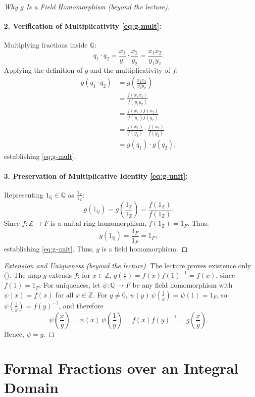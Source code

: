 \begin{content}
\begin{proof}[Why $g$ Is a Field Homomorphism (beyond the lecture)]
\paragraph{2. Verification of Multiplicativity \eqref{eq:g-mult}:}
Multiplying fractions inside $\mathbb{Q}$:
\[
q_1 \cdot q_2 = \frac{x_1}{y_1} \cdot \frac{x_2}{y_2} = \frac{x_1 x_2}{y_1 y_2}.
\]
Applying the definition of $g$ and the multiplicativity of $f$:
\begin{align*}
g(q_1 \cdot q_2) &= g\left(\frac{x_1 x_2}{y_1 y_2}\right) \\
&= \frac{f(x_1 x_2)}{f(y_1 y_2)} \\
&= \frac{f(x_1) f(x_2)}{f(y_1) f(y_2)} \\
&= \frac{f(x_1)}{f(y_1)} \cdot \frac{f(x_2)}{f(y_2)} \\
&= g(q_1) \cdot g(q_2),
\end{align*}
establishing \eqref{eq:g-mult}.

\paragraph{3. Preservation of Multiplicative Identity \eqref{eq:g-unit}:}
Representing $1_\mathbb{Q} \in \mathbb{Q}$ as $\frac{1_\mathbb{Z}}{1_\mathbb{Z}}$:
\[
g(1_\mathbb{Q}) = g\left(\frac{1_\mathbb{Z}}{1_\mathbb{Z}}\right) = \frac{f(1_\mathbb{Z})}{f(1_\mathbb{Z})}.
\]
Since $f \colon \mathbb{Z} \to F$ is a unital ring homomorphism, $f(1_\mathbb{Z}) = 1_F$. Thus:
\[
g(1_\mathbb{Q}) = \frac{1_F}{1_F} = 1_F,
\]
establishing \eqref{eq:g-unit}. Thus, $g$ is a field homomorphism.
\end{proof}

\begin{proof}[Extension and Uniqueness (beyond the lecture)]
The lecture proves existence only (). The map $g$ extends $f$: for $x \in \mathbb{Z}$, $g(\frac{x}{1}) = f(x) f(1)^{-1} = f(x)$, since $f(1) = 1_F$. For uniqueness, let $\psi \colon \mathbb{Q} \to F$ be any field homomorphism with $\psi(x) = f(x)$ for all $x \in \mathbb{Z}$. For $y \neq 0$, $\psi(y) \, \psi(\frac{1}{y}) = \psi(1) = 1_F$, so $\psi(\frac{1}{y}) = f(y)^{-1}$, and therefore
\[
\psi\left(\frac{x}{y}\right) = \psi(x) \, \psi\left(\frac{1}{y}\right) = f(x) f(y)^{-1} = g\left(\frac{x}{y}\right).
\]
Hence, $\psi = g$.
\end{proof}
\end{content}

\section{Formal Fractions over an Integral Domain}

